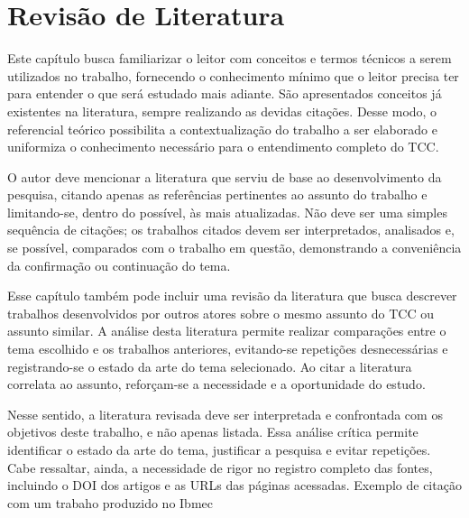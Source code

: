 \chapter{Revisão de Literatura}
\label{cap:RefTeorico}

Este capítulo busca familiarizar o leitor com conceitos e termos técnicos a serem utilizados no trabalho, fornecendo o conhecimento mínimo que o leitor precisa ter para entender o que será estudado mais adiante. São apresentados conceitos já existentes na literatura, sempre realizando as devidas citações. Desse modo, o referencial teórico possibilita a contextualização do trabalho a ser elaborado e uniformiza o conhecimento necessário para o entendimento completo do TCC.

O autor deve mencionar a literatura que serviu de base ao desenvolvimento da pesquisa, citando apenas as referências pertinentes ao assunto do trabalho e limitando-se, dentro do possível, às mais atualizadas. Não deve ser uma simples sequência de citações; os trabalhos citados devem ser interpretados, analisados e, se possível, comparados com o trabalho em questão, demonstrando a conveniência da confirmação ou continuação do tema.

Esse capítulo também pode incluir uma revisão da literatura que busca descrever trabalhos desenvolvidos por outros atores sobre o mesmo assunto do TCC ou assunto similar. A análise desta literatura permite realizar comparações entre o tema escolhido e os trabalhos anteriores, evitando-se repetições desnecessárias e registrando-se o estado da arte do tema selecionado. Ao citar a literatura correlata ao assunto, reforçam-se a necessidade e a oportunidade do estudo.

Nesse sentido, a literatura revisada deve ser interpretada e confrontada com os objetivos deste trabalho, e não apenas listada.
Essa análise crítica permite identificar o estado da arte do tema, justificar a pesquisa e evitar repetições.
Cabe ressaltar, ainda, a necessidade de rigor no registro completo das fontes, incluindo o DOI dos artigos e as URLs das páginas acessadas.
Exemplo de citação com um trabaho produzido no Ibmec~\cite{assumpcao2024estacionamento}